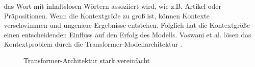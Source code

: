 \documentclass[12pt,letterpaper,ngerman]{article}
\begin{document}
das Wort mit inhaltslosen Wörtern assoziiert wird, wie z.B. Artikel 
oder Präpositionen. Wenn die Kontextgröße zu groß ist, können 
Kontexte verschwimmen und ungenaue Ergebnisse entstehen.
Folglich hat die Kontextgröße einen entscheidenden Einfluss auf den Erfolg 
des Modells. Vaswani et al. lösen das Kontextproblem 
durch die Transformer-Modellarchitektur \cite{transformer}.
\begin{figure}
  \begin{center}
  \end{center}
  \caption{Transformer-Architektur stark vereinfacht}
\end{figure}
\end{document}
